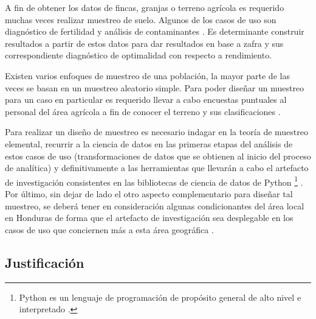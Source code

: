 \documentclass[conference]{IEEEtran}
\begin{document}
\bigbreak

A fin de obtener los datos de fincas, granjas o terreno agrícola es requerido muchas veces realizar muestreo de suelo. Algunos de los casos de uso son diagnóstico de fertilidad \cite{lassaga-2011} y análisis de contaminantes \cite{gobpe-ministerio-del-ambiente-2014}. Es determinante construir resultados a partir de estos datos para dar resultados en base a zafra y sus correspondiente diagnóstico de optimalidad con respecto a rendimiento.

\bigbreak

Existen varios enfoques de muestreo de una población, la mayor parte de las veces se basan en un muestreo aleatorio simple. Para poder diseñar un muestreo para un caso en particular es requerido llevar a cabo encuestas puntuales al personal del área agrícola a fin de conocer el terreno y sus clasificaciones \cite{organizacion-de-las-naciones-unidas-para-la-agricultura-y-la-alimentacion-1990}.

\bigbreak

Para realizar un diseño de muestreo es necesario indagar en la teoría de muestreo elemental, recurrir a la ciencia de datos en las primeras etapas del análisis de estos casos de uso (transformaciones de datos que se obtienen al inicio del proceso de analítica) y definitivamente a las herramientas que llevarán a cabo el artefacto de investigación consistentes en las bibliotecas de ciencia de datos de Python \footnote{Python es un lenguaje de programación de propósito general de alto nivel e interpretado \cite{wikipedia-python-2021}.} \cite{grus-2015} \cite{geopandas-developers-2021}. Por último, sin dejar de lado el otro aspecto complementario para diseñar tal muestreo, se deberá tener en consideración algunas condicionantes del área local en Honduras de forma que el artefacto de investigación sea desplegable en los casos de uso que conciernen más a esta área geográfica \cite{fao-2004}.

\subsection{Justificación}
\end{document}
